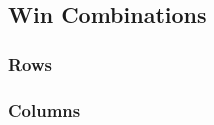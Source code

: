 \documentclass[14pt]{extreport}
\begin{document}
\pagebreak
\begin{center}
\subsection*{Win Combinations}
\vspace{2em}

\subsubsection*{Rows}

\begin{minipage}{0.3\linewidth}
   \centering
   \begin{tictactoeboard}[1.25]
      
      
   \end{tictactoeboard}
\end{minipage}
\begin{minipage}{0.3\linewidth}
   \centering
   \begin{tictactoeboard}[1.25]
      
      
   \end{tictactoeboard}
\end{minipage}
\begin{minipage}{0.3\linewidth}
   \centering
   \begin{tictactoeboard}[1.25]
      
      
   \end{tictactoeboard}
\end{minipage}

\vspace{4em}
\subsubsection*{Columns}


\end{center}
\end{document}
